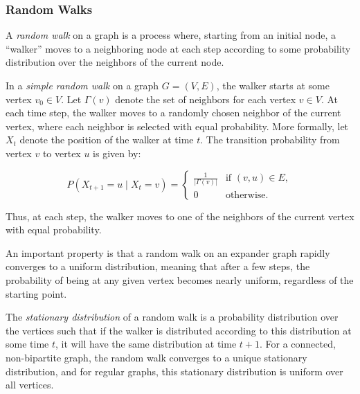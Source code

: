 \subsubsection{Random Walks} 
    
A \textit{random walk} on a graph is a process where, starting from an initial node, a ``walker'' moves to a neighboring node at each step according to some probability distribution over the neighbors of the current node. 

\begin{definition}  \label{def:simp-random-walk}
    In a \textit{simple random walk} on a graph $G = (V, E)$, the walker starts at some vertex $v_0 \in V$. Let $\Gamma(v)$ denote the set of neighbors for each vertex $v \in V$. At each time step, the walker moves to a randomly chosen neighbor of the current vertex, where each neighbor is selected with equal probability. More formally, let $X_t$ denote the position of the walker at time $t$. The transition probability from vertex $v$ to vertex $u$ is given by:
    
    $$
    P(X_{t+1} = u \mid X_t = v) =
    \begin{cases}
    \frac{1}{|\Gamma(v)|} & \text{if } (v, u) \in E, \\
    0 & \text{otherwise}.
    \end{cases}
    $$
    
    Thus, at each step, the walker moves to one of the neighbors of the current vertex with equal probability.
\end{definition}

An important property is that a random walk on an expander graph rapidly converges to a uniform distribution, meaning that after a few   steps, the probability of being at any given vertex becomes nearly uniform, regardless of the starting point.

\begin{definition}  \label{stationary-distribution}
    The \textit{stationary distribution} of a random walk is a probability distribution over the vertices such that if the walker is distributed according to this distribution at some time $t$, it will have the same distribution at time $t+1$. For a connected, non-bipartite graph, the random walk converges to a unique stationary distribution, and for regular graphs, this stationary distribution is uniform over all vertices.
\end{definition}

